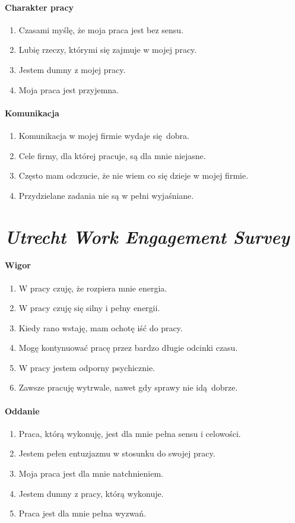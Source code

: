 \paragraph{Charakter pracy}
\begin{enumerate}
  \item Czasami myślę, że moja praca jest bez sensu.
  \item Lubię rzeczy, którymi się zajmuje w mojej pracy.
  \item Jestem dumny z mojej pracy.
  \item Moja praca jest przyjemna.
\end{enumerate}

\paragraph{Komunikacja}
\begin{enumerate}
  \item Komunikacja w mojej firmie wydaje się dobra.
  \item Cele firmy, dla której pracuje, są dla mnie niejasne.
  \item Często mam odczucie, że nie wiem co się dzieje w mojej firmie.
  \item Przydzielane zadania nie są w pełni wyjaśniane.
\end{enumerate}

\section{\emph{Utrecht Work Engagement Survey}}
\label{sec:uwes-text}
\paragraph{Wigor}
\begin{enumerate}
  \item W pracy czuję, że rozpiera mnie energia.
  \item W pracy czuję się silny i pełny energii.
  \item Kiedy rano wstaję, mam ochotę iść do pracy.
  \item Mogę kontynuować pracę przez bardzo długie odcinki czasu.
  \item W pracy jestem odporny psychicznie.
  \item Zawsze pracuję wytrwale, nawet gdy sprawy nie idą dobrze.
\end{enumerate}

\paragraph{Oddanie}
\begin{enumerate}
  \item Praca, którą wykonuję, jest dla mnie pełna sensu i celowości.
  \item Jestem pełen entuzjazmu w stosunku do swojej pracy.
  \item Moja praca jest dla mnie natchnieniem.
  \item Jestem dumny z pracy, którą wykonuje.
  \item Praca jest dla mnie pełna wyzwań.
\end{enumerate}

